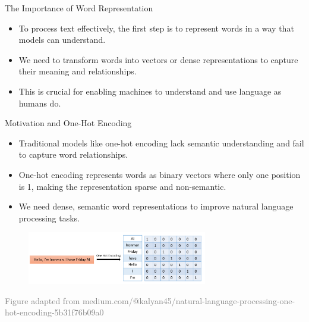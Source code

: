 \documentclass[serif, aspectratio=169]{beamer}
\begin{document}

\begin{frame}{The Importance of Word Representation}
	\begin{itemize}
		\item To process text effectively, the first step is to represent words in a way that models can understand.
		\item We need to transform words into vectors or dense representations to capture their meaning and relationships.
		\item This is crucial for enabling machines to understand and use language as humans do.
	\end{itemize}
\end{frame}



\begin{frame}{Motivation and One-Hot Encoding}
	\begin{itemize}
		\item Traditional models like one-hot encoding lack semantic understanding and fail to capture word relationships.
		\item One-hot encoding represents words as binary vectors where only one position is 1, making the representation sparse and non-semantic.
		\item We need dense, semantic word representations to improve natural language processing tasks.
	\end{itemize}
	\begin{figure}
		\centering
		\includegraphics[width=0.7\textwidth]{pic/one_hot_example.png}
	\end{figure}
	\hspace{-1.0cm}
	{\tiny \textcolor{gray}{Figure adapted from medium.com/@kalyan45/natural-language-processing-one-hot-encoding-5b31f76b09a0}}
\end{frame}
\end{document}
